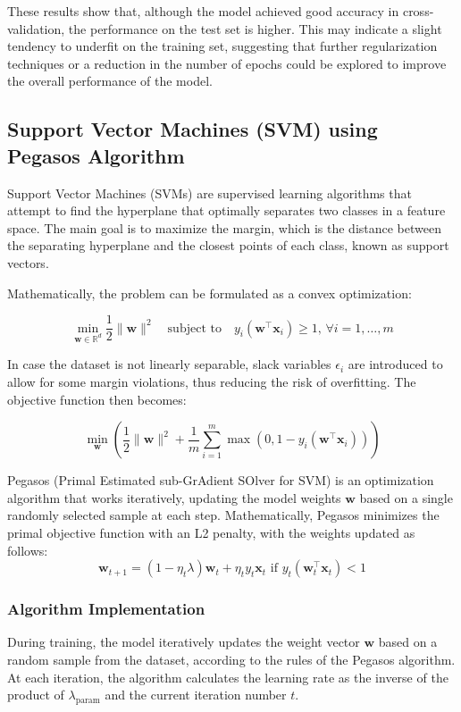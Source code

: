 \documentclass[a4paper, 10pt]{article}
\begin{document}
These results show that, although the model achieved good accuracy in cross-validation, the performance on the test set is higher. This may indicate a slight tendency to underfit on the training set, suggesting that further regularization techniques or a reduction in the number of epochs could be explored to improve the overall performance of the model.

\newpage
\subsection{Support Vector Machines (SVM) using Pegasos Algorithm}
Support Vector Machines (SVMs) are supervised learning algorithms that attempt to find the hyperplane that optimally separates two classes in a feature space. The main goal is to maximize the margin, which is the distance between the separating hyperplane and the closest points of each class, known as support vectors.

Mathematically, the problem can be formulated as a convex optimization:

\[
\min_{\mathbf{w} \in \mathbb{R}^d} \frac{1}{2} \|\mathbf{w}\|^2 \quad \text{subject to} \quad y_i (\mathbf{w}^\top \mathbf{x}_i) \geq 1, \, \forall i = 1, \dots, m
\]

In case the dataset is not linearly separable, slack variables \(\epsilon_i\) are introduced to allow for some margin violations, thus reducing the risk of overfitting. The objective function then becomes: 

\[
\min_{\mathbf{w}} \left( \frac{1}{2} \|\mathbf{w}\|^2 + \frac{1}{m} \sum_{i=1}^m \max(0, 1 - y_i (\mathbf{w}^\top \mathbf{x}_i)) \right)
\]

Pegasos (Primal Estimated sub-GrAdient SOlver for SVM) is an optimization algorithm that works iteratively, updating the model weights \(\mathbf{w}\) based on a single randomly selected sample at each step.
Mathematically, Pegasos minimizes the primal objective function with an L2 penalty, with the weights updated as follows:
\[
\mathbf{w}_{t+1} = (1 - \eta_t \lambda) \mathbf{w}_t + \eta_t y_t \mathbf{x}_t \text{ if } y_t (\mathbf{w}_t^\top \mathbf{x}_t) < 1
\]

\subsubsection{Algorithm Implementation}

During training, the model iteratively updates the weight vector \(\mathbf{w}\) based on a random sample from the dataset, according to the rules of the Pegasos algorithm. At each iteration, the algorithm calculates the learning rate as the inverse of the product of \(\lambda_{\text{param}}\) and the current iteration number \(t\).
\end{document}
